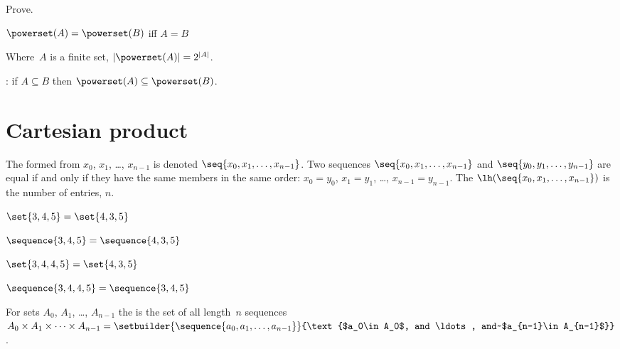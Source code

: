 \documentclass{ibl}
\begin{document}
\begin{ex} Prove.
\begin{exes}
\item $\powerset(A)=\powerset(B)$ iff $A= B$  
\item Where~$A$ is a finite set, $|\powerset(A)|=2^{|A|}$.    
\end{exes}
\end{ex}

\begin{ex} \pord:
if $A\subseteq B$ then $\powerset(A)\subseteq\powerset(B)$.  
\end{ex}




\section{Cartesian product}

\begin{df}
The  
formed from $x_0$, $x_1$, \ldots, $x_{n-1}$ is
denoted $\seq{x_0, x_1, \ldots, x_{n-1}}$.
Two sequences $\seq{x_0, x_1, \ldots, x_{n-1}}$ and
$\seq{y_0, y_1, \ldots, y_{n-1}}$ are equal if and only if
they have the same members in the same order:
$x_0=y_0$, $x_1=y_1$, \ldots, $x_{n-1}=y_{n-1}$. 
The  $\lh(\seq{x_0, x_1, \ldots, x_{n-1}})$
is the number of entries, $n$.
\end{df}

\begin{ex}\pord
\begin{exes}
\item $\set{3, 4, 5}=\set{4, 3, 5}$
\item $\sequence{3, 4, 5}=\sequence{4, 3, 5}$
\item $\set{3, 4, 4, 5}=\set{4, 3, 5}$
\item $\sequence{3, 4,4,5}=\sequence{3,4,5}$  
\end{exes}
\end{ex}

\begin{df}
For sets $A_0$, $A_1$, \ldots, $A_{n-1}$ the 
is the set of all length~$n$ sequences
$A_0\times A_1\times \cdots \times A_{n-1}
  =\setbuilder{\sequence{a_0,a_1,\ldots,a_{n-1}}}{\text{$a_0\in A_0$, and \ldots, and~$a_{n-1}\in A_{n-1}$}}$.
\end{df}
\end{document}
